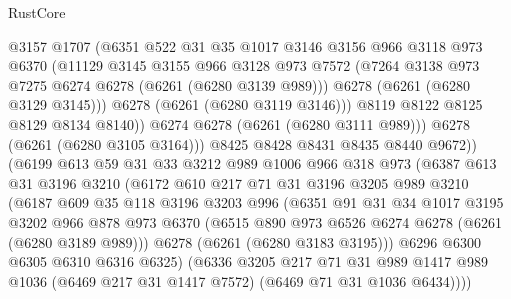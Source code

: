 \begin{lexlean}{RustCore}
\begin{coremodule}
                    @3157
                    @1707
                    (@6351
                      @522
                      @31
                      @35
                      @1017
                      @3146
                      @3156
                      @966
                      @3118
                      @973
                      @6370
                      (@11129
                        @3145
                        @3155
                        @966
                        @3128
                        @973
                        @7572
                        (@7264 @3138 @973 @7275 @6274 @6278 (@6261 (@6280 @3139 @989)))
                        @6278
                        (@6261 (@6280 @3129 @3145)))
                      @6278
                      (@6261 (@6280 @3119 @3146)))
                    @8119
                    @8122
                    @8125
                    @8129
                    @8134
                    @8140))
                @6274
                @6278
                (@6261 (@6280 @3111 @989)))
              @6278
              (@6261 (@6280 @3105 @3164)))
            @8425
            @8428
            @8431
            @8435
            @8440
            @9672))
        (@6199
          @613
          @59
          @31
          @33
          @3212
          @989
          @1006
          @966
          @318
          @973
          (@6387
            @613
            @31
            @3196
            @3210
            (@6172
              @610
              @217
              @71
              @31
              @3196
              @3205
              @989
              @3210
              (@6187
                @609
                @35
                @118
                @3196
                @3203
                @996
                (@6351
                  @91
                  @31
                  @34
                  @1017
                  @3195
                  @3202
                  @966
                  @878
                  @973
                  @6370
                  (@6515 @890 @973 @6526 @6274 @6278 (@6261 (@6280 @3189 @989)))
                  @6278
                  (@6261 (@6280 @3183 @3195)))
                @6296
                @6300
                @6305
                @6310
                @6316
                @6325)
              (@6336
                @3205
                @217
                @71
                @31
                @989
                @1417
                @989
                @1036
                (@6469 @217 @31 @1417 @7572)
                (@6469 @71 @31 @1036 @6434))))

\end{coremodule}
\end{lexlean}
